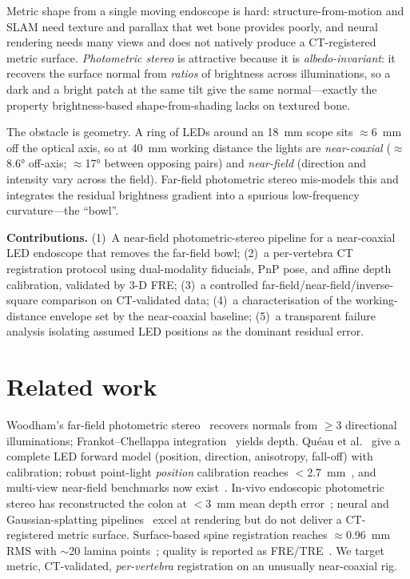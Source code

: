\documentclass[11pt]{article}
\begin{document}
Metric shape from a single moving endoscope is hard: structure-from-motion and SLAM
need texture and parallax that wet bone provides poorly, and neural rendering needs
many views and does not natively produce a CT-registered metric surface.
\emph{Photometric stereo} is attractive because it is \emph{albedo-invariant}: it
recovers the surface normal from \emph{ratios} of brightness across illuminations,
so a dark and a bright patch at the same tilt give the same normal---exactly the
property brightness-based shape-from-shading lacks on textured bone.

The obstacle is geometry. A ring of LEDs around an \SI{18}{\mm} scope sits
$\approx$\SI{6}{\mm} off the optical axis, so at \SI{40}{\mm} working distance the
lights are \emph{near-coaxial} ($\approx$\ang{8.6} off-axis; $\approx$\ang{17}
between opposing pairs) and \emph{near-field} (direction and intensity vary across
the field). Far-field photometric stereo mis-models this and integrates the residual
brightness gradient into a spurious low-frequency curvature---the ``bowl''.

\textbf{Contributions.} (1)~A near-field photometric-stereo pipeline for a
near-coaxial LED endoscope that removes the far-field bowl; (2)~a per-vertebra CT
registration protocol using dual-modality fiducials, PnP pose, and affine depth
calibration, validated by 3-D FRE; (3)~a controlled far-field/near-field/inverse-
square comparison on CT-validated data; (4)~a characterisation of the working-distance
envelope set by the near-coaxial baseline; (5)~a transparent failure analysis
isolating assumed LED positions as the dominant residual error.

\section{Related work}
Woodham's far-field photometric stereo~\cite{woodham} recovers normals from $\ge3$
directional illuminations; Frankot--Chellappa integration~\cite{fc} yields depth.
Qu\'eau et al.~\cite{queau} give a complete LED forward model (position, direction,
anisotropy, fall-off) with calibration; robust point-light \emph{position}
calibration reaches $<$\SI{2.7}{\mm}~\cite{aocalib}, and multi-view near-field
benchmarks now exist~\cite{luces}. In-vivo endoscopic photometric stereo has
reconstructed the colon at $<$\SI{3}{\mm} mean depth error~\cite{colon}; neural and
Gaussian-splatting pipelines~\cite{diff2dgs} excel at rendering but do not deliver a
CT-registered metric surface. Surface-based spine registration reaches
$\approx$\SI{0.96}{\mm} RMS with $\sim$20 lamina points~\cite{spine}; quality is
reported as FRE/TRE~\cite{fitzpatrick}. We target metric, CT-validated,
\emph{per-vertebra} registration on an unusually near-coaxial rig.
\end{document}
